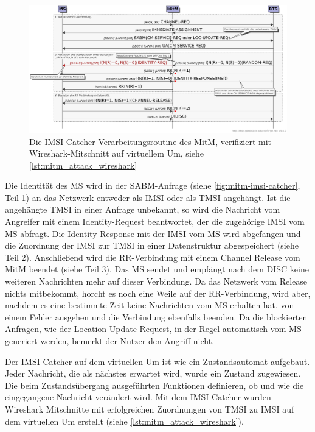 \begin{figure}[H]
	\centering \includegraphics[width=1.0\linewidth]{figures/mscgen/gsm_imsi_catcher.pdf}
	\caption[Die IMSI-Catcher Verarbeitungsroutine des MitM]{Die \ac{IMSI}-Catcher Verarbeitungsroutine des \ac{MitM}, verifiziert mit Wireshark-Mitschnitt auf virtuellem \ac{Um}, siehe \autoref{lst:mitm_attack_wireshark}} \label{fig:mitm-imsi-catcher}
\end{figure}

Die Identität des \ac{MS} wird in der \ac{SABM}-Anfrage (siehe \autoref{fig:mitm-imsi-catcher}, Teil 1) an das Netzwerk entweder als \ac{IMSI} oder als \ac{TMSI} angehängt. Ist die angehängte \ac{TMSI} in einer Anfrage unbekannt, so wird die Nachricht vom Angreifer mit einem Identity-Request beantwortet, der die zugehörige \ac{IMSI} vom \ac{MS} abfragt. Die Identity Response mit der \ac{IMSI} vom \ac{MS} wird abgefangen und die Zuordnung der \ac{IMSI} zur \ac{TMSI} in einer Datenstruktur abgespeichert (siehe Teil 2). Anschließend wird die \ac{RR}-Verbindung mit einem Channel Release vom \ac{MitM} beendet (siehe Teil 3). Das \ac{MS} sendet und empfängt nach dem \ac{DISC} keine weiteren Nachrichten mehr auf dieser Verbindung. Da das Netzwerk vom Release nichts mitbekommt, horcht es noch eine Weile auf der \ac{RR}-Verbindung, wird aber, nachdem es eine bestimmte Zeit keine Nachrichten vom \ac{MS} erhalten hat, von einem Fehler ausgehen und die Verbindung ebenfalls beenden. Da die blockierten Anfragen, wie der Location Update-Request, in der Regel automatisch vom \ac{MS} generiert werden, bemerkt der Nutzer den Angriff nicht.

Der \ac{IMSI}-Catcher auf dem virtuellen \ac{Um} ist wie ein Zustandsautomat aufgebaut. Jeder Nachricht, die als nächstes erwartet wird, wurde ein Zustand zugewiesen. Die beim Zustandsübergang ausgeführten Funktionen definieren, ob und wie die eingegangene Nachricht verändert wird. Mit dem \ac{IMSI}-Catcher wurden Wireshark Mitschnitte mit erfolgreichen Zuordnungen von \ac{TMSI} zu \ac{IMSI} auf dem virtuellen \ac{Um} erstellt (siehe \autoref{lst:mitm_attack_wireshark}). 

